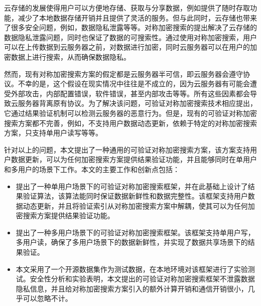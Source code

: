 \begin{cabstract}
  云存储的发展使得用户可以方便地存储、获取与分享数据，例如提供了随时存取功能，减少了本地数据存储开销并且提供了灵活的服务。但与此同时，云存储也带来了很多安全问题，例如，数据隐私泄露等等。对称加密搜索的提出解决了云存储的数据隐私泄露问题，同时也保证了数据的可搜索性。通过使用对称加密搜索，用户可以在上传数据到云服务器之前，对数据进行加密，同时云服务器可以在用户的加密数据上进行搜索，从而确保数据隐私。

  然而，现有对称加密搜索方案的假定都是云服务器半可信，即云服务器会遵守协议。不幸的是，这个假设在现实情况中往往是不成立的，因为云服务器有可能会遭受外部攻击，内部配置错误，软件错误，甚至内部攻击等等。所有这些因素都会导致云服务器背离原有协议。为了解决该问题，可验证对称加密搜索技术相应提出，它通过结果验证机制可以检测云服务器的恶意行为。但是，现有的可验证对称加密搜索方案都不完善，例如，不支持用户数据动态更新，依赖于特定的对称加密搜索方案，只支持单用户读写等等。

  针对以上的问题，本文提出了一种通用的可验证对称加密搜索方案，该方案支持用户数据更新，可以为任何加密搜索方案提供结果验证功能，并且能够同时在单用户和多用户的场景下工作。本文的主要工作和创新点包括：

  \begin{itemize}
    \item 提出了一种单用户场景下的可验证对称加密搜索框架，并在此基础上设计了结果验证算法，该算法能同时保证数据新鲜性和数据完整性。该框架支持用户数据动态更新，并且将验证索引从对称加密搜索方案中解耦，使其可以为任何加密搜索方案提供结果验证功能。
    \item 提出了一种多用户场景下的可验证对称加密搜索框架。该框架支持单用户写，多用户读，确保了多用户场景下的数据新鲜性，并实现了数据共享场景下的结果验证。
    \item 本文采用了一个开源数据集作为测试数据，在本地环境对该框架进行了实验测试。安全性分析和实验表明，本文提出的可验证对称加密搜索框架不泄露数据隐私信息，并且给对称加密搜索方案引入的额外计算开销和通信开销很小，几乎可以忽略不计。
  \end{itemize}

\end{cabstract}


